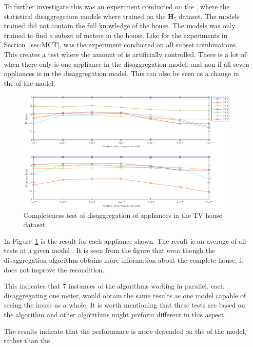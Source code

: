 To further investigate this was an experiment conducted on the , where the statistical disaggregation models where trained on the $\textbf{H}_{7}$ dataset. The models trained did not contain the full knowledge of the house. The models was only trained to find a subset of meters in the house. Like for the experiments in Section~\ref{sec:MCT}, was the experiment conducted on all subset combinations. This creates a test where the amount of  is artificially controlled. There is a lot of  when there only is one appliance in the disaggregation model, and non if all seven appliances is in the disaggregation model. This can also be seen as a change in the  of the model. 

\begin{figure}[H]
\centering
\includegraphics[width=1\textwidth]{billeder/ModelCompletness.png}
\caption{Completeness test of disaggregation of appliances in the TV house dataset }
\label{fig:COD}
\end{figure}

In Figure~\ref{fig:COD} is the result for each appliance shown. The result is an average of all tests at a given model . It is seen from the figure that even though the disaggregation algorithm obtains more information about the complete house, it does not improve the recondition. 

This indicates that 7 instances of the algorithms working in parallel, each disaggregating one meter, would obtain the same results as one model capable of seeing the house as a whole. It is worth mentioning that these tests are based on the  algorithm and other algorithms might preform different in this aspect. 

The results indicate that the performance is more depended on the  of the model, rather than the .

